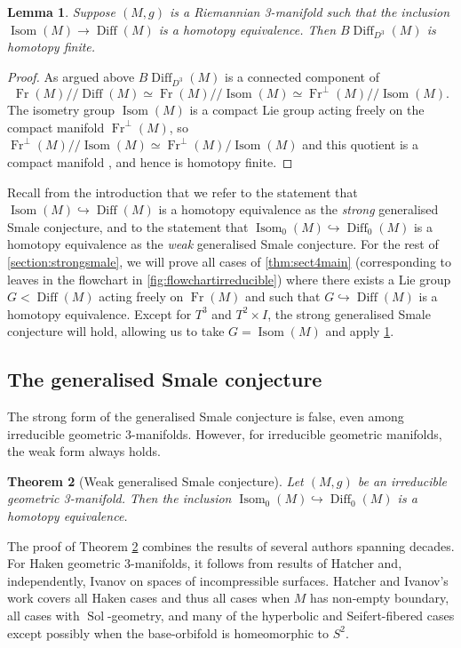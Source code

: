\documentclass{amsart}
\theoremstyle{plain}
\newtheorem{thm}{Theorem}[section]
\newtheorem{lem}[thm]{Lemma}
\theoremstyle{definition}
\DeclareMathOperator\Diff{Diff}
\DeclareMathOperator\Isom{Isom}
\DeclareMathOperator\Sol{Sol}
\DeclareMathOperator\Fr{Fr}
\newcommand{\hq}{/\!\!/} %
\newcommand{\BDiff}{B\!\Diff}
\begin{document}
\begin{lem}\label{lem:Riemannian-Finite-Quotient}
    Suppose $(M,g)$ is a Riemannian 3-manifold such that the inclusion $\Isom(M)\rightarrow \Diff(M) $ is a homotopy equivalence.  Then $\BDiff_{D^3}(M)$ is homotopy finite.  
\end{lem}
\begin{proof} 
    As argued above $\BDiff_{D^3}(M)$ is a connected component of 
\[\Fr(M)\hq \Diff(M)\simeq\Fr(M)\hq \Isom(M)\simeq \Fr^\perp(M)\hq\Isom(M).
\]
The isometry group $\Isom(M)$ is a compact Lie group acting freely on the compact manifold $\Fr^\perp(M)$, so $\Fr^\perp(M)\hq\Isom(M) \simeq \Fr^\perp(M)/\Isom(M)$ and this quotient is a compact manifold \cite[Theorem 7.10]{Lee}, and hence is homotopy finite.
\end{proof}

Recall from the introduction that we refer to the statement that $\Isom(M)\hookrightarrow \Diff(M)$ is a homotopy equivalence as the \emph{strong} generalised Smale conjecture, and to the statement that $\Isom_0(M)\hookrightarrow \Diff_0(M)$ is a homotopy equivalence as the \emph{weak} generalised Smale conjecture. 
For the rest of \cref{section:strongsmale}, we will prove all cases of \cref{thm:sect4main} (corresponding to leaves in the flowchart in \cref{fig:flowchartirreducible}) where there exists a Lie group $G< \Diff(M)$ acting freely on $\Fr(M)$ and such that $G\hookrightarrow \Diff(M)$ is a homotopy equivalence. Except for $T^3$ and $T^2\times I$, the strong generalised Smale conjecture will hold, allowing us to take $G=\Isom(M)$ and apply \cref{lem:Riemannian-Finite-Quotient}.



\subsection{The generalised Smale conjecture}\label{sec:GenSmaleFiniteness}

The strong form of the generalised Smale conjecture is false, even among irreducible geometric 3-manifolds. However, for irreducible geometric manifolds, the weak form always holds.

\begin{thm}[Weak generalised Smale conjecture]\label{thm:Gen-Smale} Let $(M,g)$ be an irreducible geometric 3-manifold.
Then the inclusion $\Isom_0(M)\hookrightarrow \Diff_0(M)$ is a homotopy equivalence.
\end{thm}

The proof of Theorem \ref{thm:Gen-Smale} combines the results of several authors spanning decades. For Haken geometric 3-manifolds, it follows from results of Hatcher \cite{Hatcher76} and, independently, Ivanov \cite{Ivanov76} on spaces of incompressible surfaces. Hatcher and Ivanov's work covers all Haken cases and thus all cases when $M$ has non-empty boundary, all cases with $\Sol$-geometry, and many of the hyperbolic and Seifert-fibered cases except possibly when the base-orbifold is homeomorphic to $S^2$. 
\end{document}
